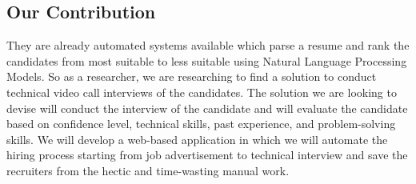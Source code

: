 \subsection{Our Contribution}
They are already automated systems available which parse a resume and rank the candidates from most suitable to less suitable using Natural Language Processing Models. So as a researcher, we are researching to find a solution to conduct technical video call interviews of the candidates. The solution we are looking to devise will conduct the interview of the candidate and will evaluate the candidate based on confidence level, technical skills, past experience, and problem-solving skills. We will develop a web-based application in which we will automate the hiring process starting from job advertisement to technical interview and save the recruiters from the hectic and time-wasting manual work.
